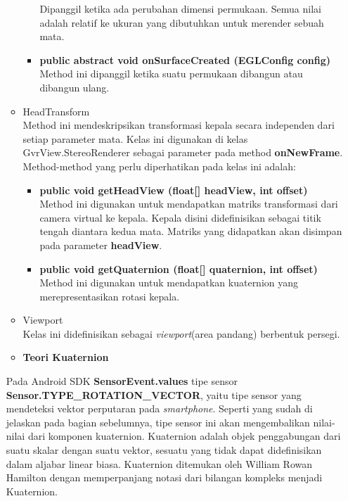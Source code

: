 \documentclass[a4paper,twoside]{article}
\begin{document}
\begin{enumerate}
\begin{itemize}
\begin{itemize}
	Dipanggil ketika ada perubahan dimensi permukaan. Semua nilai adalah relatif ke ukuran yang dibutuhkan untuk merender sebuah mata.
	\item \textbf{public abstract void onSurfaceCreated (EGLConfig config)}\\
	Method ini dipanggil ketika suatu permukaan dibangun atau dibangun ulang.
\end{itemize}
\item HeadTransform\\
	Method ini mendeskripsikan transformasi kepala secara independen dari setiap parameter mata. Kelas ini digunakan di kelas GvrView.StereoRenderer sebagai parameter pada method \textbf{onNewFrame}. Method-method yang perlu diperhatikan pada kelas ini adalah:
	\begin{itemize}
		\item \textbf{public void getHeadView (float[] headView, int offset)}\\
		Method ini digunakan untuk mendapatkan matriks transformasi dari camera virtual ke kepala. Kepala disini didefinisikan sebagai titik tengah diantara kedua mata. Matriks yang didapatkan akan disimpan pada parameter \textbf{headView}.
		\item \textbf{public void getQuaternion (float[] quaternion, int offset)}\\
		Method ini digunakan untuk mendapatkan kuaternion yang merepresentasikan rotasi kepala.
	\end{itemize}
	\item Viewport\\
	Kelas ini didefinisikan sebagai \textit{viewport}(area pandang) berbentuk persegi.
\end{itemize}



\begin{itemize}
	\item \textbf{Teori Kuaternion}
\end{itemize}
\label{sec:teori_quaternion}
Pada Android SDK \textbf{SensorEvent.values} \cite{android_developers} tipe sensor \textbf{Sensor.TYPE\_ROTATION\_VECTOR}, yaitu tipe sensor yang mendeteksi vektor perputaran pada \textit{smartphone}. Seperti yang sudah di jelaskan pada bagian sebelumnya, tipe sensor ini akan mengembalikan nilai-nilai dari komponen kuaternion. 
Kuaternion\cite{kuipers:1999} adalah objek penggabungan dari suatu skalar dengan suatu vektor, sesuatu yang tidak dapat didefinisikan dalam aljabar linear biasa. Kuaternion ditemukan oleh William Rowan Hamilton dengan memperpanjang notasi dari bilangan kompleks menjadi Kuaternion. \\


\end{enumerate}
\end{document}
